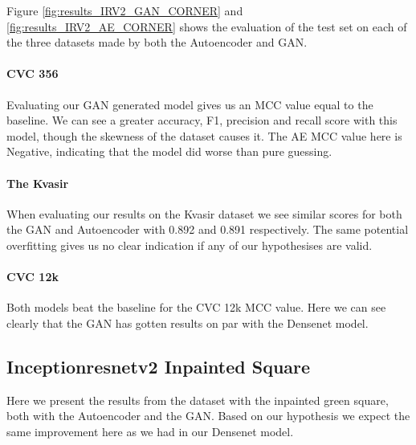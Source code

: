 %
\noindent Figure \ref{fig:results_IRV2_GAN_CORNER} and \ref{fig:results_IRV2_AE_CORNER} shows the evaluation of the test set on each of the three datasets made by both the Autoencoder and GAN. 

\paragraph{CVC 356}
Evaluating our GAN generated model gives us an MCC value equal to the baseline. We can see a greater accuracy, F1, precision and recall score with this model, though the skewness of the dataset causes it. 
The AE MCC value here is Negative, indicating that the model did worse than pure guessing. 

\paragraph{The Kvasir}
When evaluating our results on the Kvasir dataset we see similar scores for both the GAN and Autoencoder with 0.892 and 0.891 respectively.  The same potential overfitting gives us no clear indication if any of our hypothesises are valid.

\paragraph{CVC 12k}
Both models beat the baseline for the CVC 12k MCC value. Here we can see clearly that the GAN has gotten results on par with the Densenet model.
















\FloatBarrier
\subsection{Inceptionresnetv2 Inpainted Square}

Here we present the results from the dataset with the inpainted green square, both with the Autoencoder and the GAN.  
Based on our hypothesis we expect the same improvement here as we had in our Densenet model.  
 

